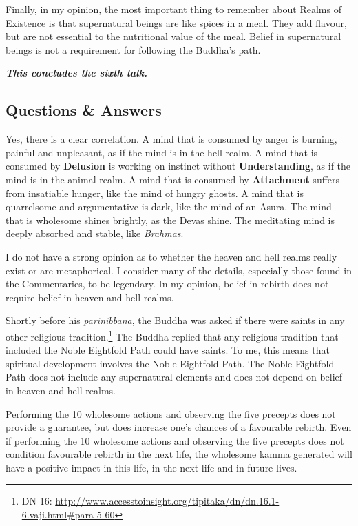 Finally, in my opinion, the most important thing to remember about Realms of Existence is that supernatural beings are like spices in a meal. They add flavour, but are not essential to the nutritional value of the meal. Belief in supernatural beings is not a requirement for following the Buddha’s path.

\begin{center}
\textbf{\textit{This concludes the sixth talk.}} \\
\end{center}

\newpage

\subsection*{Questions \& Answers}


Yes, there is a clear correlation. A mind that is consumed by anger is burning, painful and unpleasant, as if the mind is in the hell realm. A mind that is consumed by \textbf{Delusion} is working on instinct without \textbf{Understanding}, as if the mind is in the animal realm. A mind that is consumed by \textbf{Attachment} suffers from insatiable hunger, like the mind of hungry ghosts. A mind that is quarrelsome and argumentative is dark, like the mind of an Asura. The mind that is wholesome shines brightly, as the Devas shine. The meditating mind is deeply absorbed and stable, like \textit{Brahmas}.


I do not have a strong opinion as to whether the heaven and hell realms really exist or are metaphorical. I consider many of the details, especially those found in the Commentaries, to be legendary. In my opinion, belief in rebirth does not require belief in heaven and hell realms.

Shortly before his \textit{parinibbāna}, the Buddha was asked if there were saints in any other religious tradition.\footnote{DN 16: \url{http://www.accesstoinsight.org/tipitaka/dn/dn.16.1-6.vaji.html\#para-5-60}} The Buddha replied that any religious tradition that included the Noble Eightfold Path could have saints. To me, this means that spiritual development involves the Noble Eightfold Path. The Noble Eightfold Path does not include any supernatural elements and does not depend on belief in heaven and hell realms.


Performing the 10 wholesome actions and observing the five precepts does not provide a guarantee, but does increase one’s chances of a favourable rebirth. Even if performing the 10 wholesome actions and observing the five precepts does not condition favourable rebirth in the next life, the wholesome kamma generated will have a positive impact in this life, in the next life and in future lives.